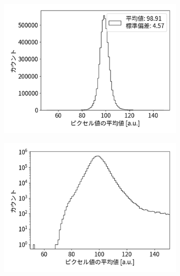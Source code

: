 \documentclass[a4paper,11pt,uplatex]{jsbook}
\begin{document}
\begin{figure}[b]
  \centering
  \begin{subfigure}[b]{0.3\linewidth}
    \centering
    \includegraphics[width=\linewidth]{image/4-BGmean.png}
  \end{subfigure}
  \hfill
  \begin{subfigure}[b]{0.3\linewidth}
    \centering
    \includegraphics[width=\linewidth]{image/4-BGmeanlog.png}
  \end{subfigure}
  \hfill
  \begin{subfigure}[b]{0.3\linewidth}
    \centering

\end{subfigure}
\end{figure}
\end{document}
